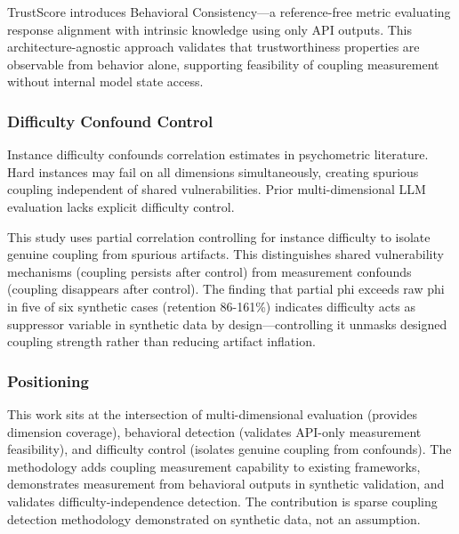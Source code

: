 TrustScore \citep{Zheng2024} introduces Behavioral Consistency---a reference-free metric evaluating response alignment with intrinsic knowledge using only API outputs. This architecture-agnostic approach validates that trustworthiness properties are observable from behavior alone, supporting feasibility of coupling measurement without internal model state access.

\subsubsection{Difficulty Confound Control}

Instance difficulty confounds correlation estimates in psychometric literature. Hard instances may fail on all dimensions simultaneously, creating spurious coupling independent of shared vulnerabilities. Prior multi-dimensional LLM evaluation lacks explicit difficulty control.

This study uses partial correlation controlling for instance difficulty to isolate genuine coupling from spurious artifacts. This distinguishes shared vulnerability mechanisms (coupling persists after control) from measurement confounds (coupling disappears after control). The finding that partial phi exceeds raw phi in five of six synthetic cases (retention 86-161\%) indicates difficulty acts as suppressor variable in synthetic data by design---controlling it unmasks designed coupling strength rather than reducing artifact inflation.

\subsubsection{Positioning}

This work sits at the intersection of multi-dimensional evaluation (provides dimension coverage), behavioral detection (validates API-only measurement feasibility), and difficulty control (isolates genuine coupling from confounds). The methodology adds coupling measurement capability to existing frameworks, demonstrates measurement from behavioral outputs in synthetic validation, and validates difficulty-independence detection. The contribution is sparse coupling detection methodology demonstrated on synthetic data, not an assumption.
